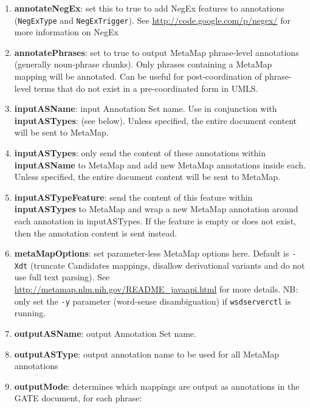 \begin{enumerate}

\item{\textbf{annotateNegEx}}: set this to true to add NegEx features to annotations 
(\texttt{NegExType} and \texttt{NegExTrigger}). See 
\url{http://code.google.com/p/negex/} for more information on NegEx

\item{\textbf{annotatePhrases}}: set to true to output MetaMap phrase-level annotations 
(generally noun-phrase chunks). Only phrases containing a MetaMap mapping will 
be annotated. Can be useful for post-coordination of phrase-level terms that do 
not exist in a pre-coordinated form in UMLS.

\item{\textbf{inputASName}}: input Annotation Set name. Use in conjunction with 
\textbf{inputASTypes}: (see below). Unless specified, the entire document content
will be sent to MetaMap. 

\item{\textbf{inputASTypes}}: only send the content of these annotations within \textbf{inputASName} to 
MetaMap and add new MetaMap annotations inside each. Unless specified, the entire document
content will be sent to MetaMap.

\item{\textbf{inputASTypeFeature}}: send the content of this feature within \textbf{inputASTypes} to MetaMap and 
wrap a new MetaMap annotation around each annotation in inputASTypes. 
If the feature is empty or does not exist, then the annotation content is sent instead.

\item{\textbf{metaMapOptions}}: set parameter-less MetaMap options here. Default is 
\texttt{-Xdt} (truncate Candidates mappings, disallow derivational variants and do not use full text parsing). 
See \url{http://metamap.nlm.nih.gov/README_javaapi.html} for more details. NB: 
only set the \texttt{-y} parameter (word-sense disambiguation) if 
\texttt{wsdserverctl} is running. 

\item{\textbf{outputASName}}: output Annotation Set name.

\item{\textbf{outputASType}}: output annotation name to be used for all MetaMap annotations

\item{\textbf{outputMode}}: determines which mappings are output as annotations in the 
GATE document, for each phrase:


\end{enumerate}
